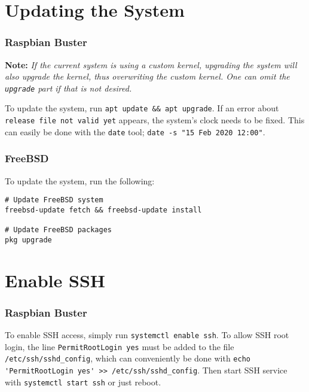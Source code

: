 \section{Updating the System} \label{update_system}


\subsubsection{Raspbian Buster}

\textbf{Note:} \textit{If the current system is using a custom kernel, upgrading the system will also upgrade the kernel, thus overwriting the custom kernel. One can omit the \lstinline{upgrade} part if that is not desired.}

To update the system, run \lstinline{apt update && apt upgrade}. If an error about \lstinline{release file not valid yet} appears, the system's clock needs to be fixed. This can easily be done with the \lstinline{date} tool; \lstinline{date -s "15 Feb 2020 12:00"}.


\subsubsection{FreeBSD}

To update the system, run the following:

\begin{verbatim}
# Update FreeBSD system
freebsd-update fetch && freebsd-update install

# Update FreeBSD packages
pkg upgrade
\end{verbatim}









\section{Enable SSH} \label{enable_ssh}


\subsubsection{Raspbian Buster}

To enable SSH access, simply run \lstinline{systemctl enable ssh}. To allow SSH root login, the line \lstinline{PermitRootLogin yes} must be added to the file \lstinline{/etc/ssh/sshd_config}, which can conveniently be done with \lstinline{echo 'PermitRootLogin yes' >> /etc/ssh/sshd_config}. Then start SSH service with \lstinline{systemctl start ssh} or just reboot.


